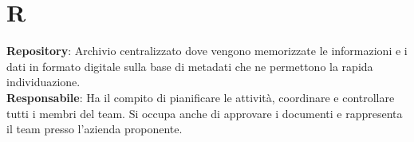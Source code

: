 \section{R}
\textbf{Repository}: Archivio centralizzato dove vengono memorizzate le informazioni e i dati in formato digitale sulla base di metadati che ne permettono la rapida individuazione.\\
\textbf{Responsabile}: Ha il compito di pianificare le attività, coordinare e controllare tutti i membri del team.
Si occupa anche di approvare i documenti e rappresenta il team presso l'azienda proponente.